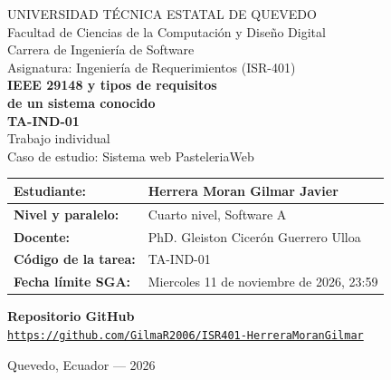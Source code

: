 \documentclass[11pt,a4paper]{article}
\begin{document}
\begin{center}
{\large UNIVERSIDAD T\'ECNICA ESTATAL DE QUEVEDO}\\[6pt]
{\normalsize Facultad de Ciencias de la Computaci\'on y Dise\~no Digital}\\[3pt]
{\normalsize Carrera de Ingenier\'ia de Software}\\[14pt]
{\normalsize Asignatura: Ingenier\'ia de Requerimientos (ISR-401)}\\[42pt]
{\LARGE\bfseries IEEE 29148 y tipos de requisitos\\[4pt] de un sistema conocido}\\[14pt]
{\large\bfseries TA-IND-01}\\[14pt]
{\normalsize Trabajo individual}\\[8pt]
{\normalsize Caso de estudio: Sistema web PasteleriaWeb}
\end{center}
\vspace{1.4cm}
\begin{tabularx}{\textwidth}{|>{\bfseries}p{4.5cm}|X|}\hline
Estudiante: & Herrera Moran Gilmar Javier \\ \hline
Nivel y paralelo: & Cuarto nivel, Software A \\ \hline
Docente: & PhD. Gleiston Cicer\'on Guerrero Ulloa \\ \hline
C\'odigo de la tarea: & TA-IND-01 \\ \hline
Fecha l\'imite SGA: & Miercoles 11 de noviembre de 2026, 23:59 \\ \hline
\end{tabularx}
\vspace{1.3cm}
\begin{center}
{\bfseries Repositorio GitHub}\\[12pt]
\mbox{\href{https://github.com/GilmaR2006/ISR401-HerreraMoranGilmar}{\small\texttt{https://github.com/GilmaR2006/ISR401-HerreraMoranGilmar}}}
\end{center}
\vfill
\begin{center}
Quevedo, Ecuador --- 2026
\end{center}
\end{document}
